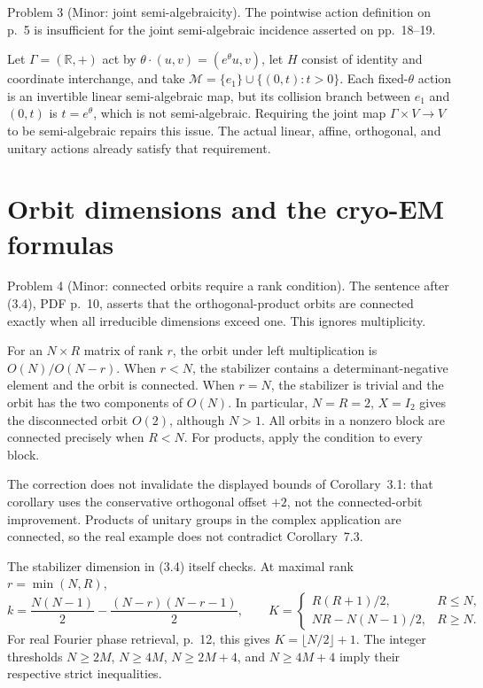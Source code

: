 \documentclass[10pt]{article}
\begin{document}
Problem 3 (Minor: joint semi-algebraicity).  The pointwise action definition on p. 5 is insufficient for the joint semi-algebraic incidence asserted on pp. 18–19.\par
Let \(\Gamma=(\mathbb R,+)\) act by \(\theta\cdot(u,v)=(e^\theta u,v)\), let \(H\) consist of identity and coordinate interchange, and take \(\mathcal M=\{e_1\}\cup\{(0,t):t>0\}\). Each fixed-\(\theta\) action is an invertible linear semi-algebraic map, but its collision branch between \(e_1\) and \((0,t)\) is \(t=e^\theta\), which is not semi-algebraic. Requiring the joint map \(\Gamma\times V\to V\) to be semi-algebraic repairs this issue. The actual linear, affine, orthogonal, and unitary actions already satisfy that requirement.\par
\section*{Orbit dimensions and the cryo-EM formulas}
Problem 4 (Minor: connected orbits require a rank condition).  The sentence after (3.4), PDF p. 10, asserts that the orthogonal-product orbits are connected exactly when all irreducible dimensions exceed one. This ignores multiplicity.\par
For an \(N\times R\) matrix of rank \(r\), the orbit under left multiplication is \(O(N)/O(N-r)\). When \(r<N\), the stabilizer contains a determinant-negative element and the orbit is connected. When \(r=N\), the stabilizer is trivial and the orbit has the two components of \(O(N)\). In particular, \(N=R=2\), \(X=I_2\) gives the disconnected orbit \(O(2)\), although \(N>1\). All orbits in a nonzero block are connected precisely when \(R<N\). For products, apply the condition to every block.\par
The correction does not invalidate the displayed bounds of Corollary 3.1: that corollary uses the conservative orthogonal offset \(+2\), not the connected-orbit improvement. Products of unitary groups in the complex application are connected, so the real example does not contradict Corollary 7.3.\par
The stabilizer dimension in (3.4) itself checks. At maximal rank \(r=\min(N,R)\), \[k=\frac{N(N-1)}2-\frac{(N-r)(N-r-1)}2,\qquad
 K=\begin{cases}
 R(R+1)/2,&R\le N,\\
 NR-N(N-1)/2,&R\ge N.
 \end{cases}\] For real Fourier phase retrieval, p. 12, this gives \(K=\lfloor N/2\rfloor+1\). The integer thresholds \(N\ge2M\), \(N\ge4M\), \(N\ge2M+4\), and \(N\ge4M+4\) imply their respective strict inequalities.\par
\end{document}
